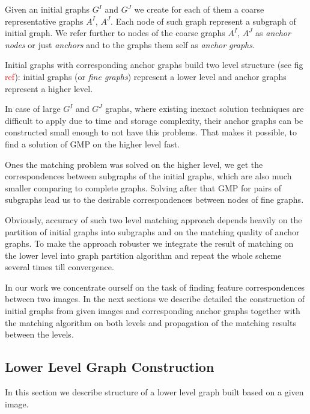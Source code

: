 \documentclass[
	fontsize=12pt,
	paper=a4,
	twoside=false,
	numbers=noenddot,
	plainheadsepline,
	toc=listof,
	toc=bibliography
]{scrartcl}
\newcommand\ToDo[1]{\textcolor{red}{#1}}
\begin{document}
Given an initial graphs $G^I$ and $G^J$ we create for each of them a coarse representative graphs $A^I$, $A^J$. Each node of such graph represent a subgraph of initial graph. We refer further to nodes of the coarse graphs $A^I$, $A^J$ as \emph{anchor nodes} or just \emph{anchors} and to the graphs them self as \emph{anchor graphs}.

Initial graphs with corresponding anchor graphs build two level structure (see fig \ToDo{ref}): initial graphs (or \emph{fine graphs}) represent a lower level and anchor graphs represent a higher level.  

In case of large $G^I$ and $G^J$ graphs, where existing inexact solution techniques are difficult to apply due to time and storage complexity, their anchor graphs can be constructed small enough to not have this problems. That makes it possible, to find a solution of GMP on the higher level fast. 

Ones the matching problem was solved on the higher level, we get the correspondences between subgraphs of the initial graphs, which are also much smaller comparing to complete graphs. Solving after that GMP for pairs of subgraphs lead us to the desirable correspondences between nodes of fine graphs.

Obviously, accuracy of such two level matching approach depends heavily on the partition of initial graphs into subgraphs and on the matching quality of anchor graphs. To make the approach robuster we integrate the result of matching on the lower level into graph partition algorithm and repeat the whole scheme several times till convergence.

In our work we concentrate ourself on the task of finding feature correspondences between two images. In the next sections we describe detailed the construction of initial graphs from given images and corresponding anchor graphs together with the matching algorithm on both levels and propagation of the matching results between the levels.

\subsection{Lower Level Graph Construction}

In this section we describe structure of a lower level graph built based on a given image.
\end{document}

